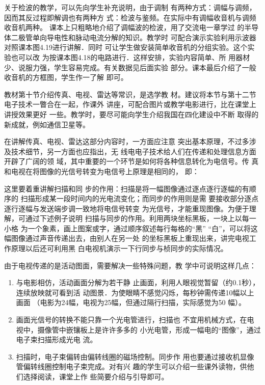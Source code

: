 关于检波的教学，可以先向学生补充说明，由于调制
有两种方式：调幅与调频，因而其反过程即解调也有两种方
式：检波与鉴频。在实际中有调幅收音机与调频收音机两种。
课本上只粗略地介绍了调幅波的检波，用了交流电一章学过
的半导体二极管单向导电性和脉动电流分解的知识。教学时
可配合演示实验利用示波器对照课本图4.19进行讲解．同时
可让学生做安装简单收音机的分组实验。这个实验也可以改
为按课本图4.18的电路进行．这样安排，实验内容简单、所
用器材少、说服力强，学生容易完成。有关数据见后面实验
部分。课本最后介绍了一般收音机的方框图，学生作一了解
即可。

教材第十节介绍传真、电视、雷达等常识，是选学教
材。建议将本节与第十二节电子技术一瞥合在一起，作课外
讲座，可配合图片或教学电影进行，比在课堂上讲授效果更好
一些。教学时，要尽可能向学生介绍我国在四化建设中不断
取得的新成就，例如通信卫星等。

在讲解传真、电视、雷达这部分内容时，一方面应注意
突出基本原理，不过多涉及技术细节，另一方面也应指出，无
线电电子技术给人们在传递和处理信息方面开辟了广阔的领
域，其中重要的一个环节是如何将各种信息转化为电信号。传
真和电视在将图像的光信号转变为电信号上原理是相同的，
即：
\begin{center}
    \end{center}
这里要着重讲解扫描和同
步的作用：扫描是将一幅图像通过逐点逐行逐幅的有顺序的
扫描形成某一段时间内的光电流变化；而同步的作用则是需
要接收部分逐点逐行逐幅与发送端步调一致地将电信号转变
为光信号，才能重现图像。为便于理解，可通过下述例子说明
扫描与同步的作用。利用两块坐标黑板，一块上以每一小格
为一个象素，画上图案或字，通过顺序叙述每行每格的“黑”
“白”，可以将这幅图像通过声音传递出去，由别人在另一处
的坐标黑板上重现出来，讲完电视工作原理以后还可利用黑
白电视机演示一下行同步与桢同步的实际情况。

由于电视传递的是活动图面，需要解决一些特殊问题，教
学中可说明这样几点：
\begin{enumerate}
\item 与电影相仿，活动画面分解为若干静
止画面，利用人眼视觉暂留（约0.1秒），连续放映就可看到活
动图景．为使眼睛不感觉闪烁，每秒钟需传递10幅以上画面
（电影为24幅，电视为25幅，但通过隔行扫描，实际感觉为50
幅）。
\item 画面光信号的转换不能只靠一个光电管进行，扫描也
不宜用机械方式，在电视中，摄像管中嵌镶板上是许许多多的
小光电管，形成一幅电的“图像”，通过电子束扫描形成光电
流。
\item 扫描时，电子束偏转由偏转线圈的磁场控制。同步作
用也要通过接收机显像管偏转线圈控制电子束完成。对有兴
趣的学生可以介绍一些课外读物，供他们选择阅读，课堂上作
些简要介绍与引导即可。
\end{enumerate}


